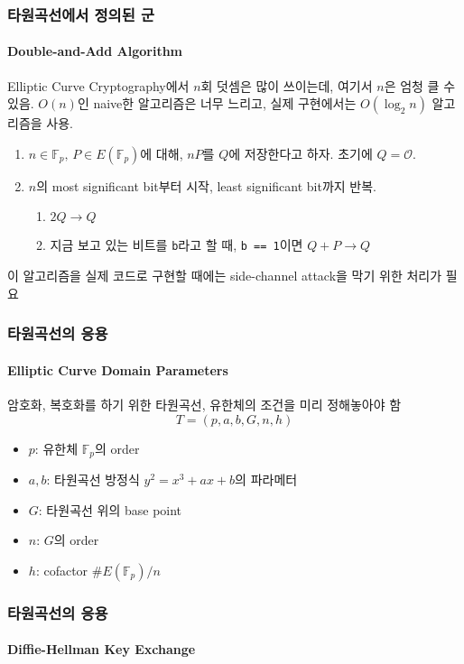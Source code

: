 \documentclass[aspectratio=169,mathserif]{beamer}
\newcommand{\Fp}{\mathbb{F}_p}
\begin{document}
  \begin{frame}
    \frametitle{타원곡선에서 정의된 군}
    \framesubtitle{Double-and-Add Algorithm}

    Elliptic Curve Cryptography에서 \(n\)회 덧셈은 많이 쓰이는데, 여기서 \(n\)은 엄청 클 수 있음.\newline
    \pause
    \(O(n)\)인 naive한 알고리즘은 너무 느리고, 실제 구현에서는 \(O(\log_2 n)\) 알고리즘을 사용.
    \begin{enumerate}
      \item \(n\in\Fp,\,P\in E(\Fp)\)에 대해, \(nP\)를 \(Q\)에 저장한다고 하자. 초기에 \(Q = \mathcal{O}\).
      \item \(n\)의 most significant bit부터 시작, least significant bit까지 반복.
      \pause
      \begin{enumerate}
        \item \(2Q\to Q\)
        \item 지금 보고 있는 비트를 \texttt{b}라고 할 때, \texttt{b == 1}이면 \(Q + P\to Q\)
      \end{enumerate}
    \end{enumerate}
    \pause
    이 알고리즘을 실제 코드로 구현할 때에는 side-channel attack을 막기 위한 처리가 필요
  \end{frame}

  \begin{frame}
    \frametitle{타원곡선의 응용}
    \framesubtitle{Elliptic Curve Domain Parameters}

    암호화, 복호화를 하기 위한 타원곡선, 유한체의 조건을 미리 정해놓아야 함
    \[T=(p,a,b,G,n,h)\]
    \begin{itemize}
      \item \(p\): 유한체 \(\Fp\)의 order
      \item \(a, b\): 타원곡선 방정식 \(y^2 = x^3 + ax + b\)의 파라메터
      \item \(G\): 타원곡선 위의 base point
      \item \(n\): \(G\)의 order
      \item \(h\): cofactor \(\#E(\Fp)/n\)
    \end{itemize}
  \end{frame}

  \begin{frame}
    \frametitle{타원곡선의 응용}
    \framesubtitle{Diffie-Hellman Key Exchange}

    \begin{figure}
      \centering
    \scalebox{0.4}{}
    \end{figure}
  \end{frame}
\end{document}
